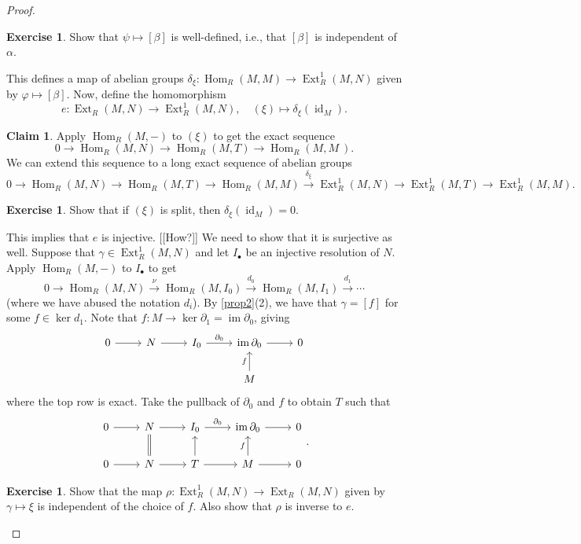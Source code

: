 \documentclass[10pt,letterpaper,cm]{nupset}
\theoremstyle{definition}
\theoremstyle{theorem}
\newtheorem*{claim}{Claim}
\newtheorem{exercise}[definition]{Exercise}
\theoremstyle{remark}
\newcommand{\1}{\mathbf{1}}
\newcommand{\0}{\vec 0}
\DeclareMathOperator{\id}{id}
\DeclareMathOperator{\ext}{Ext}
\DeclareMathOperator{\im}{im}
\DeclareMathOperator{\Hom}{Hom}
\begin{document}
\begin{proof}
\begin{exercise}
Show that $\psi \mapsto [\beta]$ is well-defined, i.e., that $[\beta]$ is independent of $\alpha$. 
\end{exercise} 
This defines a map of abelian groups $\delta_{\xi}: \Hom_R(M, M) \to \ext^1_R(M, N)$ given by $\varphi \mapsto [\beta]$. Now, define the homomorphism $$e: \ext_R(M, N) \to \ext^1_R(M , N), \quad (\xi) \mapsto \delta_{\xi}(\id_M).$$

\begin{claim}  Apply $\Hom_R(M, -)$ to $(\xi)$ to get the exact sequence $$0 \to \Hom_R(M, N) \to \Hom_R(M, T) \to \Hom_R(M, M\
)  . $$   
We can extend this sequence to a long exact sequence of abelian groups $$0 \to \Hom_R(M, N) \to \Hom_R(M, T) \to \Hom_R(M, M)  \overset{\delta_{\xi}}{\longrightarrow} \ext^1_R(M, N) \to \ext^1_R(M, T) \to \ext^1_R(M, M).$$
\end{claim}
\begin{exercise}
Show that if $(\xi)$ is split, then $\delta_{\xi}(\id_M) =0$.
\end{exercise} 
This implies that  $e$ is injective. {[[How?]]} We need to show that it is surjective as well. Suppose that $\gamma \in \ext_R^1(M, N)$ and let $I_{\bullet}$ be an injective resolution of $N$. Apply $\Hom_R(M, -)$ to $I_{\bullet}$ to get $$0 \to \Hom_R(M, N) \overset{\nu}{\longrightarrow} \Hom_R(M, I_0) \overset{d_0}{\longrightarrow} \Hom_R(M, I_1) \overset{d_1}{\longrightarrow} \cdots   $$ (where we have abused the notation $d_i$). 
By \cref{prop2}(2), we have that $\gamma = [f]$ for some $f\in \ker{d_1}$. Note that $f: M \to \ker{\partial_1} = \im{\partial_0}$, giving 
\[ \begin{tikzcd}
0 \arrow[r] & N \arrow[r] & I_0 \arrow[r, "\partial_0"] & \im{\partial_0} \arrow[r] & 0 \\
 &  &  & M \arrow[u, "f"] & 
\end{tikzcd}
\] where the top row is exact. Take the pullback of $\partial_0$ and $f$ to obtain $T$ such that
\[
\begin{tikzcd}
0 \arrow[r] & N \arrow[r] & I_0 \arrow[r, "\partial_0"] & \im{\partial_0} \arrow[r] & 0 \\
0 \arrow[r] & N \arrow[r] \arrow[u, equal] & T \arrow[r] \arrow[u] & M \arrow[u, "f"] \arrow[r] & 0
\end{tikzcd}
.\]
\begin{exercise}
Show that the map $\rho: \ext_R^1(M, N) \to \ext_R(M, N)$ given by $\gamma \mapsto \xi$ is independent of the choice of $f$. Also show that $\rho$ is inverse to  $e$.
\end{exercise}
\end{proof}
\end{document}
